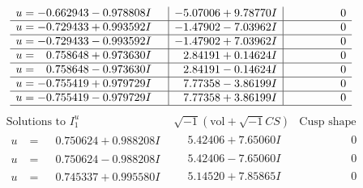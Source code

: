 \documentclass[1p]{elsarticle_modified}
\theoremstyle{definition}
\newcommand{\I}{\sqrt{-1}}
\begin{document}
$$\begin{array}{c|c|c}
\begin{aligned}
u &= -0.662943 - 0.978808 I\end{aligned}
 & -5.07006 + 9.78770 I & \phantom{-0.000000 } 0 \\ \hline\begin{aligned}
u &= -0.729433 + 0.993592 I\end{aligned}
 & -1.47902 - 7.03962 I & \phantom{-0.000000 } 0 \\ \hline\begin{aligned}
u &= -0.729433 - 0.993592 I\end{aligned}
 & -1.47902 + 7.03962 I & \phantom{-0.000000 } 0 \\ \hline\begin{aligned}
u &= \phantom{-}0.758648 + 0.973630 I\end{aligned}
 & \phantom{-}2.84191 + 0.14624 I & \phantom{-0.000000 } 0 \\ \hline\begin{aligned}
u &= \phantom{-}0.758648 - 0.973630 I\end{aligned}
 & \phantom{-}2.84191 - 0.14624 I & \phantom{-0.000000 } 0 \\ \hline\begin{aligned}
u &= -0.755419 + 0.979729 I\end{aligned}
 & \phantom{-}7.77358 - 3.86199 I & \phantom{-0.000000 } 0 \\ \hline\begin{aligned}
u &= -0.755419 - 0.979729 I\end{aligned}
 & \phantom{-}7.77358 + 3.86199 I & \phantom{-0.000000 } 0\\
 \hline 
 \end{array}$$\newpage$$\begin{array}{c|c|c}  
\text{Solutions to }I^u_{1}& \I (\text{vol} + \sqrt{-1}CS) & \text{Cusp shape}\\
 \hline 
\begin{aligned}
u &= \phantom{-}0.750624 + 0.988208 I\end{aligned}
 & \phantom{-}5.42406 + 7.65060 I & \phantom{-0.000000 } 0 \\ \hline\begin{aligned}
u &= \phantom{-}0.750624 - 0.988208 I\end{aligned}
 & \phantom{-}5.42406 - 7.65060 I & \phantom{-0.000000 } 0 \\ \hline\begin{aligned}
u &= \phantom{-}0.745337 + 0.995580 I\end{aligned}
 & \phantom{-}5.14520 + 7.85865 I & \phantom{-0.000000 } 0 \\ \hline\begin{aligned}

\end{aligned}
\end{array}$$
\end{document}
